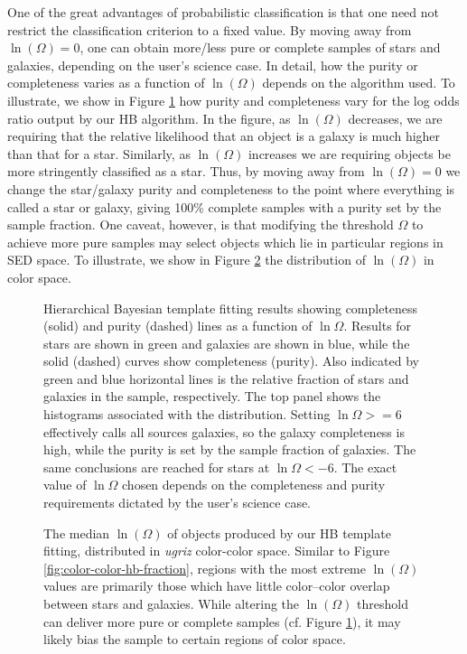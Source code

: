 \documentclass[12pt,preprint]{aastex}
\begin{document}
One of the great advantages of probabilistic classification is that
one need not restrict the classification criterion to a fixed value.
By moving away from $\ln(\Omega)=0$, one can obtain more/less pure or
complete samples of stars and galaxies, depending on the user's
science case.  In detail, how the purity or completeness varies as a
function of $\ln(\Omega)$ depends on the algorithm used.  To
illustrate, we show in Figure \ref{fig:hb-logodds} how purity and
completeness vary for the log odds ratio output by our HB algorithm.
In the figure, as $\ln(\Omega)$ decreases, we are requiring that the
relative likelihood that an object is a galaxy is much higher than
that for a star.  Similarly, as $\ln(\Omega)$ increases we are
requiring objects be more stringently classified as a star.  Thus, by
moving away from $\ln(\Omega)=0$ we change the star/galaxy purity and
completeness to the point where everything is called a star or galaxy,
giving 100\% complete samples with a purity set by the sample
fraction.  One caveat, however, is that modifying the threshold
$\Omega$ to achieve more pure samples may select objects which lie in
particular regions in SED space.  To illustrate, we show in Figure
\ref{fig:color-color-hb-odds} the distribution of $\ln(\Omega)$ in
color space.

\begin{figure}
\centering
\caption{Hierarchical Bayesian template fitting results showing
  completeness (solid) and purity (dashed) lines as a function of
  $\ln\Omega$.  Results for stars are shown in green and galaxies are
  shown in blue, while the solid (dashed) curves show completeness
  (purity).  Also indicated by green and blue horizontal lines is the
  relative fraction of stars and galaxies in the sample, respectively.
  The top panel shows the histograms associated with the
  distribution. Setting $\ln\Omega>=6$ effectively calls all sources
  galaxies, so the galaxy completeness is high, while the purity is
  set by the sample fraction of galaxies.  The same conclusions are
  reached for stars at $\ln\Omega<-6$.  The exact value of $\ln\Omega$
  chosen depends on the completeness and purity requirements dictated
  by the user's science case.}
\label{fig:hb-logodds}
\end{figure}



\begin{figure}
\centering
\caption{The median $\ln(\Omega)$ of objects produced by our HB
  template fitting, distributed in {\it ugriz} color-color space.
  Similar to Figure \ref{fig:color-color-hb-fraction}, regions with
  the most extreme $\ln(\Omega)$ values are primarily those which have
  little color--color overlap between stars and galaxies.  While
  altering the $\ln(\Omega)$ threshold can deliver more pure or
  complete samples (cf. Figure \ref{fig:hb-logodds}), it may likely
  bias the sample to certain regions of color space.}
\label{fig:color-color-hb-odds}
\end{figure}
\end{document}
